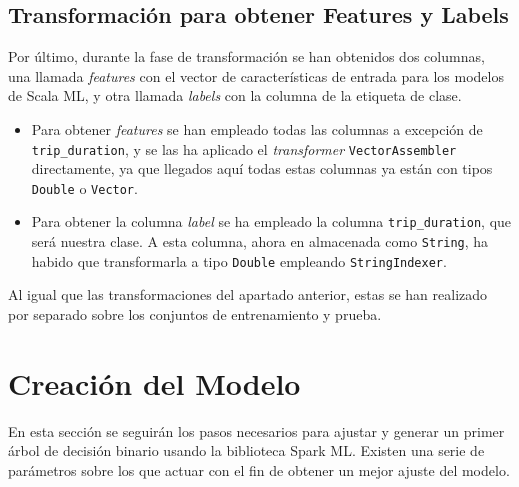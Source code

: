 \documentclass[12pt]{article}
\begin{document}
\subsection{Transformación para obtener Features y Labels}
Por último, durante la fase de transformación se han obtenidos dos columnas, una llamada \textit{features} con el vector de características de entrada para los modelos de Scala ML, y otra llamada \textit{labels} con la columna de la etiqueta de clase.

\begin{itemize}
    \item Para obtener \textit{features} se han empleado todas las columnas a excepción de \texttt{trip\_duration}, y se las ha aplicado el \textit{transformer} \texttt{VectorAssembler} directamente, ya que llegados aquí todas estas columnas ya están con tipos \texttt{Double} o \texttt{Vector}.
    \item Para obtener la columna \textit{label} se ha empleado la columna \texttt{trip\_duration}, que será nuestra clase. A esta columna, ahora en almacenada como \texttt{String}, ha habido que transformarla a tipo \texttt{Double} empleando \texttt{StringIndexer}.
\end{itemize}

Al igual que las transformaciones del apartado anterior, estas se han realizado por separado sobre los conjuntos de entrenamiento y prueba.

\section{Creación del Modelo}

En esta sección se seguirán los pasos necesarios para ajustar y generar un primer árbol de decisión binario usando la biblioteca Spark ML. Existen una serie de parámetros sobre los que actuar con el fin de obtener un mejor ajuste del modelo.
\end{document}
